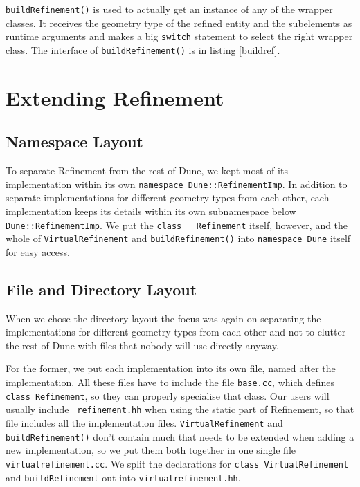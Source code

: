 \documentclass[english,a4paper]{article}
\newcommand{\code}[1]{\textnormal{\lstinline{#1}}}
\begin{document}
\code{buildRefinement()} is used to actually get an instance of
any of the wrapper classes.  It receives the geometry type of the
refined entity and the subelements as runtime arguments and makes a
big \code{switch} statement to select the right wrapper class.
The interface of \code{buildRefinement()} is in listing
\ref{buildref}.

\section{Extending Refinement}

\subsection{Namespace Layout}

To separate Refinement from the rest of Dune, we kept most of its
implementation within its own \code{namespace Dune::RefinementImp}.
In addition to separate implementations for different geometry types
from each other, each implementation keeps its details within its own
subnamespace below \code{Dune::RefinementImp}.  We put the \code{class
  Refinement} itself, however, and the whole of
\code{VirtualRefinement} and \code{buildRefinement()} into
\code{namespace Dune} itself for easy access.

\subsection{File and Directory Layout}

When we chose the directory layout the focus was again on separating
the implementations for different geometry types from each other and
not to clutter the rest of Dune with files that nobody will use
directly anyway.

For the former, we put each implementation into its own file, named
after the implementation.  All these files have to include the file
{\tt base.cc}, which defines \code{class Refinement}, so they can
properly specialise that class.  Our users will usually include {\tt
  refinement.hh} when using the static part of Refinement, so that
file includes all the implementation files.  \code{VirtualRefinement}
and \code{buildRefinement()} don't contain much that needs to be
extended when adding a new implementation, so we put them both
together in one single file {\tt virtualrefinement.cc}.  We split the
declarations for \code{class VirtualRefinement} and
\code{buildRefinement} out into {\tt virtualrefinement.hh}.
\end{document}
